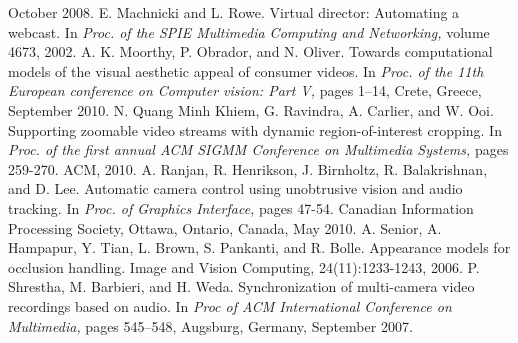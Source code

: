 \documentclass{sig-alternate-05-2015}
\begin{document}
\begin{thebibliography}{9}
October 2008.
 E. Machnicki and L. Rowe. Virtual director: Automating a
webcast. In \textit{Proc. of the SPIE Multimedia Computing and
Networking,} volume 4673, 2002.
A. K. Moorthy, P. Obrador, and N. Oliver. Towards
computational models of the visual aesthetic appeal of
consumer videos. In \textit{Proc. of the 11th European conference
on Computer vision: Part V,} pages 1–14, Crete, Greece,
September 2010.
 N. Quang Minh Khiem, G. Ravindra, A. Carlier, and W. Ooi.
Supporting zoomable video streams with dynamic
region-of-interest cropping. In \textit{Proc. of the first annual ACM
SIGMM Conference on Multimedia Systems, }pages 259-270.
ACM, 2010.
 A. Ranjan, R. Henrikson, J. Birnholtz, R. Balakrishnan, and
D. Lee. Automatic camera control using unobtrusive vision
and audio tracking. In \textit{Proc. of Graphics Interface,} pages
47-54. Canadian Information Processing Society, Ottawa,
Ontario, Canada, May 2010.
 A. Senior, A. Hampapur, Y. Tian, L. Brown, S. Pankanti, and
R. Bolle. Appearance models for occlusion handling. Image
and Vision Computing, 24(11):1233-1243, 2006.
 P. Shrestha, M. Barbieri, and H. Weda. Synchronization of
multi-camera video recordings based on audio. In\textit{ Proc of
ACM International Conference on Multimedia,} pages
545–548, Augsburg, Germany, September 2007.

\end{thebibliography}
\end{document}
